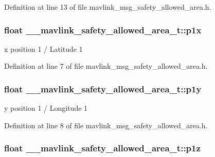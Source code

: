 Definition at line 13 of file mavlink\-\_\-msg\-\_\-safety\-\_\-allowed\-\_\-area.\-h.

\hypertarget{struct____mavlink__safety__allowed__area__t_ae919b7b7d619c59c1cd250efb99b0417}{
\subsubsection[{p1x}]{\setlength{\rightskip}{0pt plus 5cm}float \-\_\-\-\_\-mavlink\-\_\-safety\-\_\-allowed\-\_\-area\-\_\-t\-::p1x}}\label{struct____mavlink__safety__allowed__area__t_ae919b7b7d619c59c1cd250efb99b0417}


x position 1 / Latitude 1 



Definition at line 7 of file mavlink\-\_\-msg\-\_\-safety\-\_\-allowed\-\_\-area.\-h.

\hypertarget{struct____mavlink__safety__allowed__area__t_a31433025a6ccc7032b9142172824339a}{
\subsubsection[{p1y}]{\setlength{\rightskip}{0pt plus 5cm}float \-\_\-\-\_\-mavlink\-\_\-safety\-\_\-allowed\-\_\-area\-\_\-t\-::p1y}}\label{struct____mavlink__safety__allowed__area__t_a31433025a6ccc7032b9142172824339a}


y position 1 / Longitude 1 



Definition at line 8 of file mavlink\-\_\-msg\-\_\-safety\-\_\-allowed\-\_\-area.\-h.

\hypertarget{struct____mavlink__safety__allowed__area__t_ad1c4edfad8de3bcc22fa3c18d14fc101}{
\subsubsection[{p1z}]{\setlength{\rightskip}{0pt plus 5cm}float \-\_\-\-\_\-mavlink\-\_\-safety\-\_\-allowed\-\_\-area\-\_\-t\-::p1z}}\label{struct____mavlink__safety__allowed__area__t_ad1c4edfad8de3bcc22fa3c18d14fc101}


